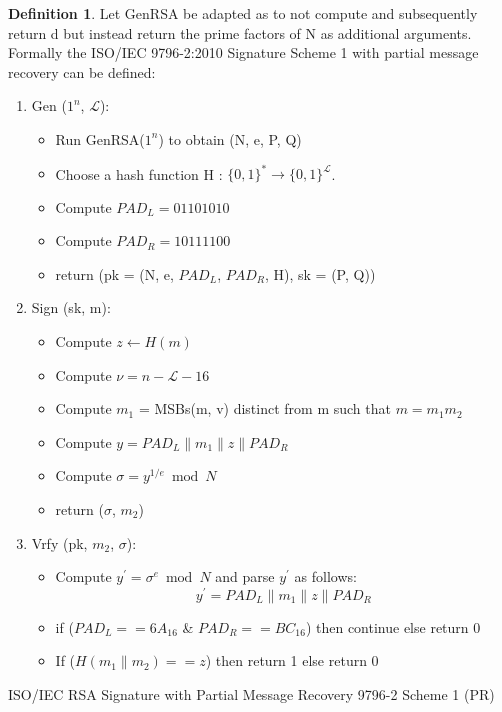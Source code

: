 \documentclass[]{final_report}
\theoremstyle{definition}
\newtheorem{definition}{Definition}[chapter]
\begin{document}
\begin{definition}
Let GenRSA be adapted as to not compute and subsequently return d but instead return the prime factors of N as additional arguments. Formally the ISO/IEC 9796-2:2010 Signature Scheme 1 with partial message recovery can be defined:
\begin{enumerate}
    \item Gen ($1^n$, $\mathcal{L}$): 
    \begin{itemize}
    \item[] Run GenRSA($1^n$) to obtain (N, e, P, Q)
    \item[] Choose a hash function H : $\{0, 1\}^* \rightarrow \{0, 1\}^\mathcal{L}$.
    \item[] Compute $PAD_{L} = 01101010$
    \item[] Compute $PAD_{R} = 10111100$
    \item[] return (pk = (N, e, $PAD_{L}$, $PAD_{R}$, H), sk = (P, Q))
    \end{itemize}

    \item Sign (sk, m):
    \begin{itemize}
    \item[] Compute $z \leftarrow H(m)$
    \item[] Compute $\nu = n - \mathcal{L} - 16$
    \item[] Compute $m_{1}$ = MSBs(m, v) distinct from m such that $m = m_{1} m_{2}$ 
    \item[] Compute $y = PAD_{L} \| m_{1} \| z \| PAD_{R}$
    \item[] Compute $\sigma = y^{1/e} \bmod N$
    \item[] return ($\sigma$, $m_{2}$)
    \end{itemize}
   
    \item Vrfy (pk, $m_{2}$, $\sigma$):  
    \begin{itemize}
    \item[] Compute $y^{'} = \sigma^{e} \bmod N$ and parse $y^{'}$ as follows:
     \[y^{'} = PAD_{L} \| m_{1} \| z \| PAD_{R}\]
    \item[] if ($PAD_{L} == 6A_{16}$ \& $PAD_{R} == BC_{16}$) then continue else return 0
    \item[] If ($H(m_{1} \| m_{2}) == z$) then return 1 else return 0
    \end{itemize}
\end{enumerate}
ISO/IEC RSA Signature with Partial Message Recovery 9796-2 Scheme 1 (PR)
\end{definition}
\end{document}
